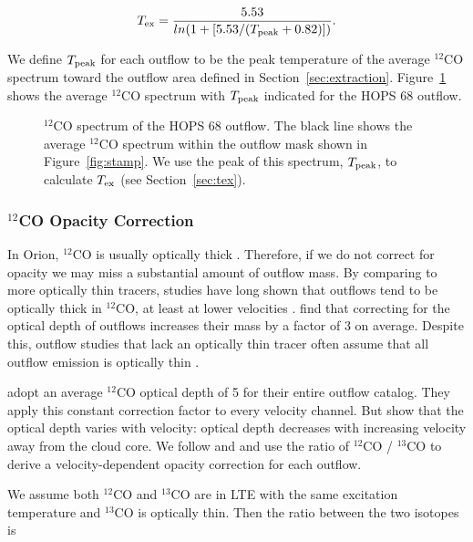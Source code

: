 \documentclass[twocolumn]{aastex63}
\newcommand{\example}{HOPS 68}
\newcommand{\tex}{$T_{\rm ex}$}
\newcommand{\co}[1][]{\ensuremath{^{#1}}CO}
\begin{document}
\begin{equation}\label{eq:Tex}
T_{\rm ex} = \frac{5.53}{ln(1 + [5.53/(T_{\rm peak} + 0.82)])}.
\end{equation}

We define $T_{\rm peak}$ for each outflow to be the peak temperature of the average $^{12}$CO spectrum toward the outflow area defined in Section~\ref{sec:extraction}. Figure~\ref{fig:tex} shows the average $^{12}$CO spectrum with $T_{\rm peak}$ indicated for the \example{} outflow.

\begin{figure}
\caption{\co[12]{} spectrum of the \example{} outflow. The black line shows the average \co[12]{} spectrum within the outflow mask shown in Figure~\ref{fig:stamp}. We use the peak of this spectrum, $T_{\rm peak}$, to calculate \tex{} (see Section~\ref{sec:tex}). \label{fig:tex}}
\end{figure}


\subsubsection{$^{12}$CO Opacity Correction}\label{sec:opacity}
In Orion, \co[12]{} is usually optically thick \citep{Kong18}. Therefore, if we do not correct for opacity we may miss a substantial amount of outflow mass. By comparing to more optically thin tracers, studies have long shown that outflows tend to be optically thick in \co[12]{}, at least at lower velocities \citep[e.g.,][]{Goldsmith84,Arce01}. \citet{Dunham14} find that correcting for the optical depth of outflows increases their mass by a factor of 3 on average. Despite this, outflow studies that lack an optically thin tracer often assume that all outflow emission is optically thin \citep[e.g. in Orion,][]{Morgan91,Takahashi08}. 

\citet{Tanabe:submitted} adopt an average \co[12]{} optical depth of 5 for their entire outflow catalog. They apply this constant correction factor to every velocity channel. But \citet{Dunham14} show that the optical depth varies with velocity: optical depth decreases with increasing velocity away from the cloud core. We follow \citet{Dunham14} and \citet{ZhangY16} and use the ratio of $^{12}$CO / $^{13}$CO to derive a velocity-dependent opacity correction for each outflow.

We assume both \co[12]{} and \co[13]{} are in LTE with the same excitation temperature and \co[13]{} is optically thin. Then the ratio between the two isotopes is
\end{document}
